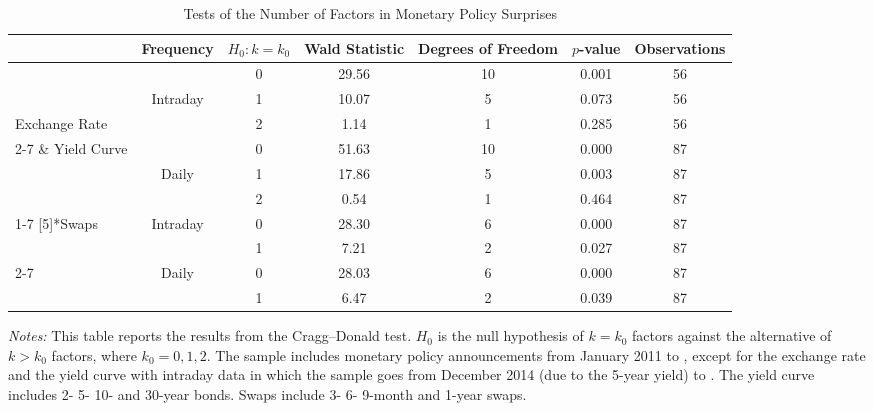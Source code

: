 \documentclass[a4paper,10pt]{article}
\begin{document}
\begin{normalsize}
\begin{landscape}
\begin{table}
\centering
\begin{threeparttable}
\caption{Tests of the Number of Factors in Monetary Policy Surprises}
\label{tab:ranktests}
\begin{tabular}{lcccccc}
\toprule
 & Frequency & \(H_{0}: k = k_{0}\) & Wald Statistic & Degrees of Freedom & \(p\)-value & Observations \\
\midrule
  &  & 0 & 29.56 & 10 & 0.001 & 56 \\
 & Intraday & 1 & 10.07 & 5 & 0.073 & 56 \\
Exchange Rate &  & 2 &  1.14 & 1 & 0.285 & 56 \\
\cmidrule(lr){2-7}
\& Yield Curve &  & 0 & 51.63 & 10 & 0.000 & 87 \\
 & Daily & 1 & 17.86 & 5 & 0.003 & 87 \\
 &  & 2 &  0.54 & 1 & 0.464 & 87 \\
\cmidrule(lr){1-7}
\multirow{4}[5]{*}{Swaps} & \multirow{2}{*}{Intraday} & 0 & 28.30 & 6 & 0.000 & 87 \\
 &  & 1 &  7.21 & 2 & 0.027 & 87 \\
\cmidrule(lr){2-7}
 & \multirow{2}{*}{Daily} & 0 & 28.03 & 6 & 0.000 & 87 \\
 &  & 1 &  6.47 & 2 & 0.039 & 87 \\
\bottomrule
\end{tabular}
\begin{tablenotes}
\footnotesize \textit{Notes:} This table reports the results from the Cragg--Donald test. \(H_{0}\) is the null hypothesis of \(k = k_{0}\) factors against the alternative of \(k > k_{0}\) factors, where \(k_{0} = 0, 1, 2\). The sample includes monetary policy announcements from January 2011 to \lastobs, except for the exchange rate and the yield curve with intraday data in which the sample goes from December 2014 (due to the 5-year yield) to \lastobs. The yield curve includes 2- 5- 10- and 30-year bonds. Swaps include 3- 6- 9-month and 1-year swaps.
\end{tablenotes}
\end{threeparttable}
\end{table}
\end{landscape}
\end{normalsize}
\end{document}
